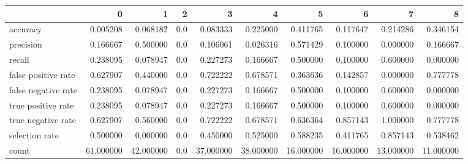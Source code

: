 \begin{tabular}{lrrrrrrrrr}
\toprule
{} &          0 &          1 &    2 &          3 &          4 &          5 &          6 &          7 &          8 \\
\midrule
accuracy            &   0.005208 &   0.068182 &  0.0 &   0.083333 &   0.225000 &   0.411765 &   0.117647 &   0.214286 &   0.346154 \\
precision           &   0.166667 &   0.500000 &  0.0 &   0.106061 &   0.026316 &   0.571429 &   0.100000 &   0.000000 &   0.166667 \\
recall              &   0.238095 &   0.078947 &  0.0 &   0.227273 &   0.166667 &   0.500000 &   0.100000 &   0.600000 &   0.000000 \\
false positive rate &   0.627907 &   0.440000 &  0.0 &   0.722222 &   0.678571 &   0.363636 &   0.142857 &   0.000000 &   0.777778 \\
false negative rate &   0.238095 &   0.078947 &  0.0 &   0.227273 &   0.166667 &   0.500000 &   0.100000 &   0.600000 &   0.000000 \\
true positive rate  &   0.238095 &   0.078947 &  0.0 &   0.227273 &   0.166667 &   0.500000 &   0.100000 &   0.600000 &   0.000000 \\
true negative rate  &   0.627907 &   0.560000 &  0.0 &   0.722222 &   0.678571 &   0.636364 &   0.857143 &   1.000000 &   0.777778 \\
selection rate      &   0.500000 &   0.000000 &  0.0 &   0.450000 &   0.525000 &   0.588235 &   0.411765 &   0.857143 &   0.538462 \\
count               &  61.000000 &  42.000000 &  0.0 &  37.000000 &  38.000000 &  16.000000 &  16.000000 &  13.000000 &  11.000000 \\
\bottomrule
\end{tabular}
